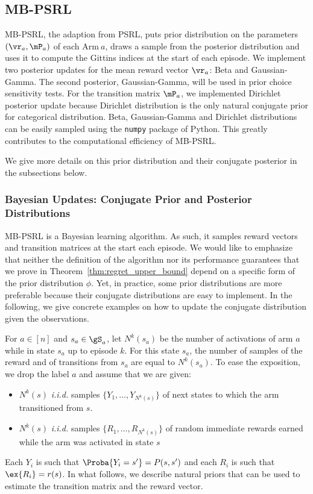 \begin{subappendices}
\subsection{MB-PSRL}
\label{sssec:impl_gittinsPS}

MB-PSRL, the adaption from PSRL, puts prior distribution on the parameters $(\vr_a,\mP_a)$ of each Arm$~a$, draws a sample from the posterior distribution and uses it to compute the Gittins indices at the start of each episode. We implement two posterior updates for the mean reward vector $\vr_a$: Beta and Gaussian-Gamma. The second posterior, Gaussian-Gamma, will be used in prior choice sensitivity tests. For the transition matrix $\mP_a$, we implemented Dirichlet posterior update because Dirichlet distribution is the only natural conjugate prior for categorical distribution. Beta, Gaussian-Gamma and Dirichlet distributions can be easily sampled using the \texttt{numpy} package of Python. This greatly contributes to the computational efficiency of MB-PSRL.

We give more details on this prior distribution and their conjugate posterior in the subsections below.

\subsubsection{Bayesian Updates: Conjugate Prior and Posterior Distributions}
\label{apx:Bayes}

MB-PSRL is a Bayesian learning algorithm. 
As such, it samples reward vectors and transition matrices at the start each episode.
We would like to emphasize that neither the definition of the algorithm nor its performance guarantees that we prove in Theorem~\ref{thm:regret_upper_bound} depend on a specific form of the prior distribution $\phi$. 
Yet, in practice, some prior distributions are more preferable because their conjugate distributions are easy to implement. 
In the following, we give concrete examples on how to update the conjugate distribution given the observations. 

For $a\in[n]$ and $s_a\in\gS_a$, let $N^{k}(s_a)$ be the number of activations of arm $a$ while in state $s_a$ up to episode $k$. 
For this state $s_a$, the number of samples of the reward and of transitions from $s_a$ are equal to $N^{k}(s_a)$. 
To ease the exposition, we drop the label $a$ and assume that we are given: 
\begin{itemize}
    \item $N^{k}(s)$ \emph{i.i.d.} samples $\{Y_1,\dots,Y_{N^{k}(s)}\}$ of next states to which the arm transitioned from $s$.
    \item $N^{k}(s)$ \emph{i.i.d.} samples $\{R_1,\dots,R_{N^{k}(s)}\}$ of random immediate rewards earned while the arm was activated in state $s$
\end{itemize}
Each $Y_i$ is such that $\Proba{Y_i=s'}=P(s,s')$ and each $R_i$ is such that $\ex{R_i}=r(s)$. In what follows, we describe natural priors that can be used to estimate the transition matrix and the reward vector. 


\end{subappendices}
